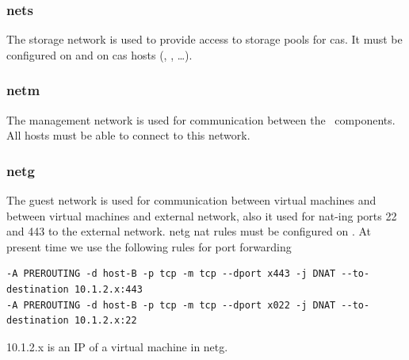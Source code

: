 \subsubsection{\acrfull{nets}}
The storage network is used to provide access to storage pools for \acrshort{ca}s. 
It must be configured on  and on \acrshort{ca}s hosts (, , \dots).

\subsubsection{\acrfull{netm}}
The management network is used for communication between the \cstack\ components. 
All hosts must be able to connect to this network.

\subsubsection{\acrfull{netg}}
The guest network is used for communication between virtual machines and between virtual machines and external network, also it used for \acrshort{nat}-ing ports 22 and 443 to the external network.
\acrshort{netg} \acrshort{nat} rules must be configured on .
At present time we use the following rules for port forwarding
\begin{lstlisting}
-A PREROUTING -d host-B -p tcp -m tcp --dport x443 -j DNAT --to-destination 10.1.2.x:443
-A PREROUTING -d host-B -p tcp -m tcp --dport x022 -j DNAT --to-destination 10.1.2.x:22
\end{lstlisting}
10.1.2.x is an IP of a virtual machine in \acrshort{netg}.
